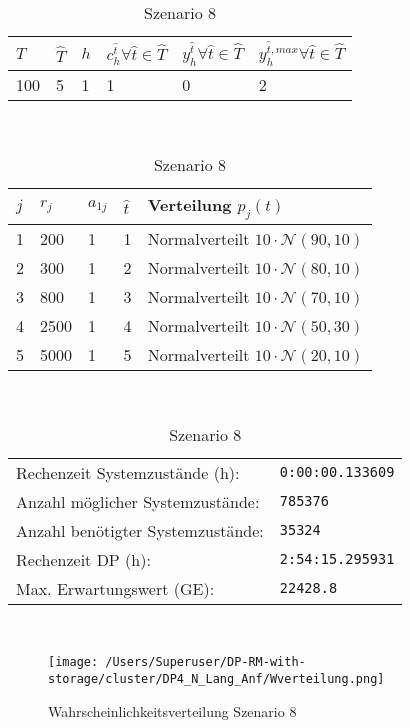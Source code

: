 \begin{table}[h!]
\renewcommand{\arraystretch}{1.5}
  \begin{center}
    \caption{Szenario 8}  \label{S8}
    \vspace*{3mm}
    \begin{tabular}{l l l l l l}   %
    $T$ & $\hat T$  & $h$ & $c_h^{\hat t}\forall \hat{t}\in{\hat T}$ & $y_h^{\hat t}\forall \hat{t}\in{\hat T}$  & $y_h^{{\hat t},max}\forall \hat{t}\in{\hat T}$  \\  \hline
100 & 5 & 1 & 1 & 0 & 2  \\ \hline
    \end{tabular} \\[3mm]
        \begin{tabular}{p{1cm} p{1cm} p{1cm}  p{1cm} p{6cm}}   %
    $j$ & $r_j$  & $a_{1j}$ & $\hat t$ & Verteilung $p_j(t)$ \\  \hline
1 & 200 & 1 & 1 & Normalverteilt $10\cdot\mathcal{N}(90, 10)$   \\
2 & 300 & 1 & 2 & Normalverteilt $10\cdot\mathcal{N}(80, 10)$  \\
3 & 800 & 1 & 3 & Normalverteilt $10\cdot\mathcal{N}(70, 10)$  \\
4 & 2500 & 1 & 4 & Normalverteilt $10\cdot\mathcal{N}(50, 30)$  \\
5 & 5000 & 1 & 5 & Normalverteilt $10\cdot\mathcal{N}(20, 10)$ \\
\hline
    \end{tabular} \\[3mm]
     \begin{tabular}{p{7cm}p{5cm}} \hline
     Rechenzeit Systemzustände (h): & \texttt{0:00:00.133609} \\
     Anzahl möglicher Systemzustände: & \texttt{785376} \\
     Anzahl benötigter Systemzustände: & \texttt{35324} \\ 
     Rechenzeit DP (h): & \texttt{2:54:15.295931} \\ 
          Max. Erwartungswert (GE): & \texttt{22428.8} \\ \hline
         \end{tabular} \\[3mm]
  \end{center}
\end{table}

\begin{figure}[h!]
  \begin{center}
    \texttt{[image: /Users/Superuser/DP-RM-with-storage/cluster/DP4\_N\_Lang\_Anf/Wverteilung.png]}
    \caption{Wahrscheinlichkeitsverteilung Szenario 8}  \label{SB8}
  \end{center}
\end{figure}

